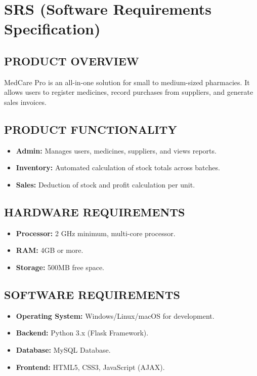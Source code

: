 \documentclass[12pt, a4paper]{report}
\begin{document}
\chapter{SRS (Software Requirements Specification)}

\section{PRODUCT OVERVIEW}
MedCare Pro is an all-in-one solution for small to medium-sized pharmacies. It allows users to register medicines, record purchases from suppliers, and generate sales invoices.

\section{PRODUCT FUNCTIONALITY}
\begin{itemize}
    \item \textbf{Admin:} Manages users, medicines, suppliers, and views reports.
    \item \textbf{Inventory:} Automated calculation of stock totals across batches.
    \item \textbf{Sales:} Deduction of stock and profit calculation per unit.
\end{itemize}

\section{HARDWARE REQUIREMENTS}
\begin{itemize}
    \item \textbf{Processor:} 2 GHz minimum, multi-core processor.
    \item \textbf{RAM:} 4GB or more.
    \item \textbf{Storage:} 500MB free space.
\end{itemize}

\section{SOFTWARE REQUIREMENTS}
\begin{itemize}
    \item \textbf{Operating System:} Windows/Linux/macOS for development.
    \item \textbf{Backend:} Python 3.x (Flask Framework).
    \item \textbf{Database:} MySQL Database.
    \item \textbf{Frontend:} HTML5, CSS3, JavaScript (AJAX).
\end{itemize}
\end{document}
